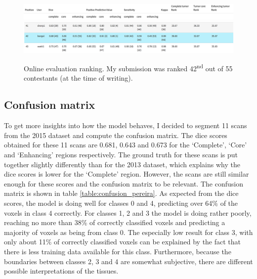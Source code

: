 \documentclass[12pt,a4paper,twoside,openright]{report}
\begin{document}
\begin{figure}
	\centering
	\includegraphics[width=\textwidth]{ranking_table_header}
	\includegraphics[width=\textwidth]{pereira_model_ranked_results}
	\caption[Online evaluation ranking.]{Online evaluation ranking. My submission was ranked 42\textsuperscript{nd} out of 55 contestants (at the time of writing).}
	\label{fig:online_eval_rank}
\end{figure}

\subsection{Confusion matrix}
To get more insights into how the model behaves, I decided to segment 11 scans from the 2015 dataset and compute the confusion matrix. The dice scores obtained for these 11 scans are 0.681, 0.643 and 0.673 for the `Complete', `Core' and `Enhancing' regions respectively. The ground truth for these scans is put together slightly differently than for the 2013 dataset, which explains why the dice scores is lower for the `Complete' region. However, the scans are still similar enough for these scores and the confusion matrix to be relevant. The confusion matrix is shown in table \ref{table:confusion_pereira}. As expected from the dice scores, the model is doing well for classes 0 and 4, predicting over 64\% of the voxels in class 4 correctly. For classes 1, 2 and 3 the model is doing rather poorly, reaching no more than 38\% of correctly classified voxels and predicting a majority of voxels as being from class 0. The especially low result for class 3, with only about 11\% of correctly classified voxels can be explained by the fact that there is less training data available for this class. Furthermore, because the boundaries between classes 2, 3 and 4 are somewhat subjective, there are different possible interpretations of the tissues.
\end{document}
